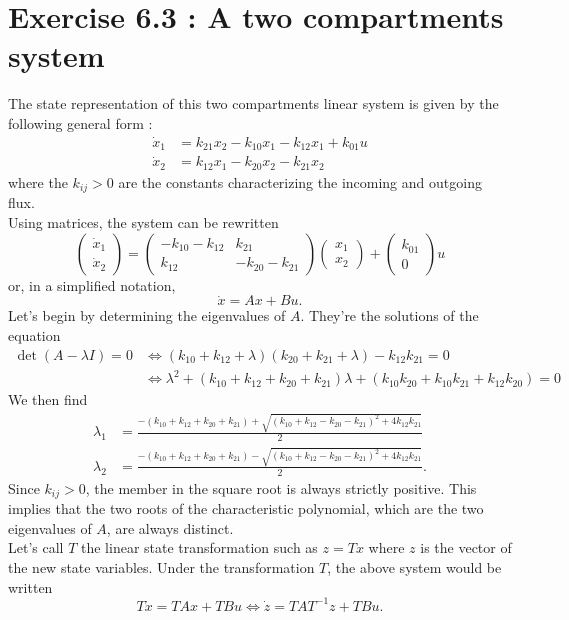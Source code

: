 \section*{Exercise 6.3 : A two compartments system}
The state representation of this two compartments linear system is given by the following general form :
\begin{align*}
\dot{x}_1 & = k_{21}x_2-k_{10}x_1-k_{12}x_1+k_{01}u\\
\dot{x}_2 & = k_{12}x_1-k_{20}x_2-k_{21}x_2
\end{align*}
where the $k_{ij} > 0$ are the constants characterizing the incoming and outgoing flux. \\
Using matrices, the system can be rewritten
$$\begin{pmatrix}
\dot{x}_1\\
\dot{x}_2
\end{pmatrix}=
\begin{pmatrix}
-k_{10}-k_{12} & k_{21} \\
k_{12} & -k_{20}-k_{21}
\end{pmatrix}
\begin{pmatrix}
x_1\\
x_2
\end{pmatrix}+
\begin{pmatrix}
k_{01}\\
0
\end{pmatrix}u$$
or, in a simplified notation,
$$\dot{x} = Ax + Bu.$$
Let's begin by determining the eigenvalues of $A$. They're the solutions of the equation
\begin{align*}
\det(A-\lambda I)=0 & \iff (k_{10}+k_{12}+\lambda)(k_{20}+k_{21}+\lambda)-k_{12}k_{21}=0\\
 & \iff \lambda^2 + (k_{10}+k_{12}+k_{20}+k_{21})\lambda + (k_{10}k_{20}+k_{10}k_{21}+k_{12}k_{20}) = 0
\end{align*}
We then find
\begin{align*}
\lambda_1 & = \frac{-(k_{10}+k_{12}+k_{20}+k_{21}) + \sqrt{(k_{10}+k_{12}-k_{20}-k_{21})^2+4k_{12}k_{21}}}{2}\\
\lambda_2 & = \frac{-(k_{10}+k_{12}+k_{20}+k_{21}) - \sqrt{(k_{10}+k_{12}-k_{20}-k_{21})^2+4k_{12}k_{21}}}{2}.
\end{align*}
Since $k_{ij}>0$, the member in the square root is always strictly positive. This implies that the two roots of the characteristic polynomial, which are the two eigenvalues of $A$, are always distinct.\\
Let's call $T$ the linear state transformation such as $z = Tx$ where $z$ is the vector of the new state variables. Under the transformation $T$, the above system would be written $$T\dot{x} = TAx + TBu \iff \dot{z} = TAT^{-1}z + TBu.$$
